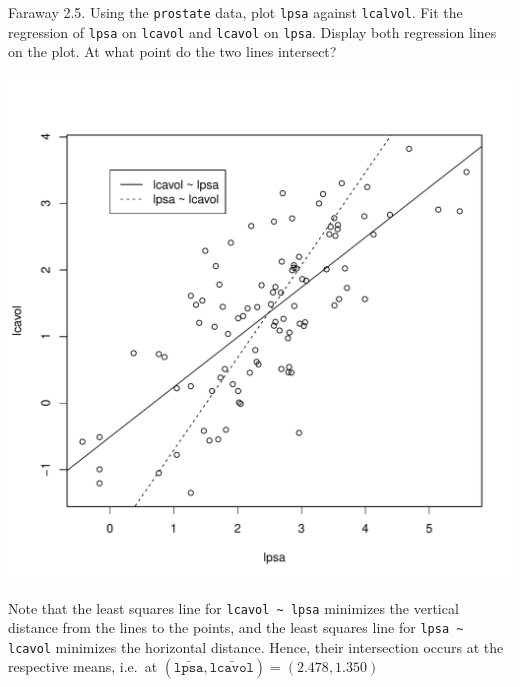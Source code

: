 \documentclass{homework}
\begin{document}
\begin{longproblem}
  Faraway 2.5. Using the \texttt{prostate} data, plot \texttt{lpsa} against \texttt{lcalvol}.  Fit the regression of \texttt{lpsa} on \texttt{lcavol} and \texttt{lcavol} on \texttt{lpsa}.  Display both regression lines on the plot.  At what point do the two lines intersect?
\end{longproblem}

\begin{solution}
\begin{minipage}{.45\textwidth}
\includegraphics[width=\textwidth]{two_lines.pdf}
\end{minipage}
\begin{minipage}{.45\textwidth}
  Note that the least squares line for \verb|lcavol ~ lpsa|
  minimizes the vertical distance from the lines to the points, and
  the least squares line for \verb|lpsa ~ lcavol| minimizes the
  horizontal distance.  Hence, their intersection occurs at the
  respective means,
  i.e.~at $(\bar{\mathtt{lpsa}},\bar{\mathtt{lcavol}}) = (2.478, 1.350)$
\end{minipage}

\end{solution}
\end{document}
